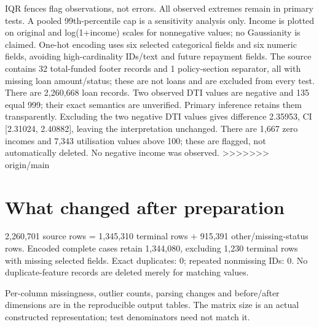\documentclass[10pt,a4paper,twocolumn]{article}
\begin{document}
IQR fences flag observations, not errors. All observed extremes remain in primary tests. A pooled 99th-percentile cap is a sensitivity analysis only. Income is plotted on original and log(1+income) scales for nonnegative values; no Gaussianity is claimed. One-hot encoding uses six selected categorical fields and six numeric fields, avoiding high-cardinality IDs/text and future repayment fields.
The source contains 32 total-funded footer records and 1 policy-section separator, all with missing loan amount/status; these are not loans and are excluded from every test. There are 2,260,668 loan records. Two observed DTI values are negative and 135 equal 999; their exact semantics are unverified. Primary inference retains them transparently. Excluding the two negative DTI values gives difference 2.35953, CI [2.31024, 2.40882], leaving the interpretation unchanged. There are 1,667 zero incomes and 7,343 utilisation values above 100; these are flagged, not automatically deleted. No negative income was observed.
>>>>>>> origin/main

\section{What changed after preparation}
2,260,701 source rows = 1,345,310 terminal rows + 915,391 other/missing-status rows. Encoded complete cases retain 1,344,080, excluding 1,230 terminal rows with missing selected fields. Exact duplicates: 0; repeated nonmissing IDs: 0. No duplicate-feature records are deleted merely for matching values.

Per-column missingness, outlier counts, parsing changes and before/after dimensions are in the reproducible output tables. The matrix size is an actual constructed representation; test denominators need not match it.
\end{document}
